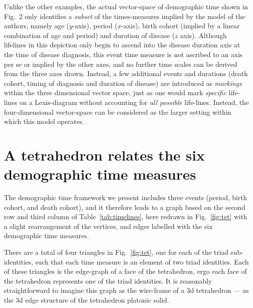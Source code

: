 \documentclass[12pt,oneside,a4paper]{article} %
\theoremstyle{definition}
\begin{document}
Unlike the other examples, the actual vector-space of demographic
time shown in \citet{brinks2014lexis} Fig.~2 only identifies a
\emph{subset} of the times-measures implied by the model of the
authors, namely age ($y$-axis), period ($x$-axis), birth cohort (implied by a
linear combination of age and period) and duration of disease ($z$ axis).
Although lifelines in this depiction only begin to ascend into the disease
duration axis at the time of disease diagnosis, this event time measure is not
ascribed to an axis per se or implied by the other axes, and no further time
scales can be derived from the three axes drawn.
Instead, a few additional events and durations (death cohort, timing of
diagnosis and duration of disease) are introduced as \emph{markings} within the three
dimensional vector space, just as one would mark \emph{specific} life-lines on
a Lexis-diagram without accounting for \emph{all possible} life-lines.
Instead, the four-dimensional vector-space can be considered as the larger
setting within which this model operates.


\FloatBarrier
\section{A tetrahedron relates the six demographic time measures}
\label{sec:tetrahedron}
The demographic time framework we present includes three events (period, birth
cohort, and death cohort), and it therefore leads to a graph
based on the second row and third column of Table~\ref{tab:timelines}, here
redrawn in Fig.~\ref{fig:tet} with a slight rearrangement of the
vertices, and edges labelled with the six demographic time measures.

There are a total of four triangles in Fig.~\ref{fig:tet}, one for each
of the triad sub-identities, such that each time measure is an element of two
triad identities. Each of these triangles is the
edge-graph of a face of the tetrahedron, ergo each face of the tetrahedron
represents one of the triad identities. It is reasonably straightforward to
imagine this graph as the wire-frame of a 3d
tetrahedron --- as the 3d edge structure of the tetrahedron platonic solid.
\end{document}
